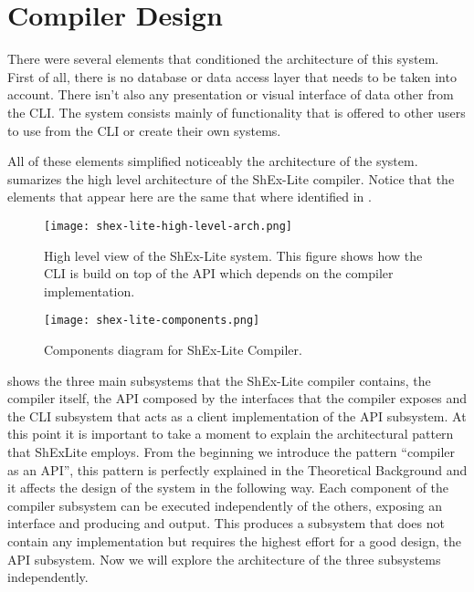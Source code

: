 \section{Compiler Design}
There were several elements that conditioned the architecture of this system. First of all,
there is no database or data access layer that needs to be taken into account. There isn’t
also any presentation or visual interface of data other from the CLI. The system consists
mainly of functionality that is offered to other users to use from the CLI or create their own
systems. 

All of these elements simplified noticeably the architecture of the system.  sumarizes the high level architecture of the ShEx-Lite compiler. Notice that the elements that appear here are the same that where identified in .

\begin{figure}[h]
    \texttt{[image: shex-lite-high-level-arch.png]}
    \caption[High level view of the ShEx-Lite system]{High level view of the ShEx-Lite system. This figure shows how the CLI is build on top of the API which depends on the compiler implementation.}
\end{figure}

\begin{figure}[h]
    \texttt{[image: shex-lite-components.png]}
    \caption[Components diagram for ShEx-Lite Compiler]{Components diagram for ShEx-Lite Compiler.}
\end{figure}

 shows the three main subsystems that the ShEx-Lite compiler contains, the
compiler itself, the API composed by the interfaces that the compiler exposes and the CLI
subsystem that acts as a client implementation of the API subsystem.
At this point it is important to take a moment to explain the architectural pattern that ShExLite employs. From the beginning we introduce the pattern “compiler as an API”, this
pattern is perfectly explained in the Theoretical Background and it affects the design of the
system in the following way.
Each component of the compiler subsystem can be executed independently of the others,
exposing an interface and producing and output. This produces a subsystem that does not
contain any implementation but requires the highest effort for a good design, the API
subsystem.
Now we will explore the architecture of the three subsystems independently.

